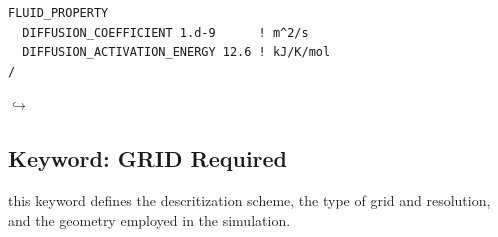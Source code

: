 \documentclass[12pt]{article}
\newcommand\return{{\hfill$\hookrightarrow$}}
\begin{document}
\begin{verbatim}
FLUID_PROPERTY
  DIFFUSION_COEFFICIENT 1.d-9      ! m^2/s
  DIFFUSION_ACTIVATION_ENERGY 12.6 ! kJ/K/mol
/
\end{verbatim}

\hyperlink{target_key}{\return}


\newpage
\protect\hypertarget{target_grid}{}

\subsection{Keyword: GRID \hfill Required}

 this keyword defines the descritization scheme, the type of grid and resolution, and the geometry employed in the simulation.
\end{document}
